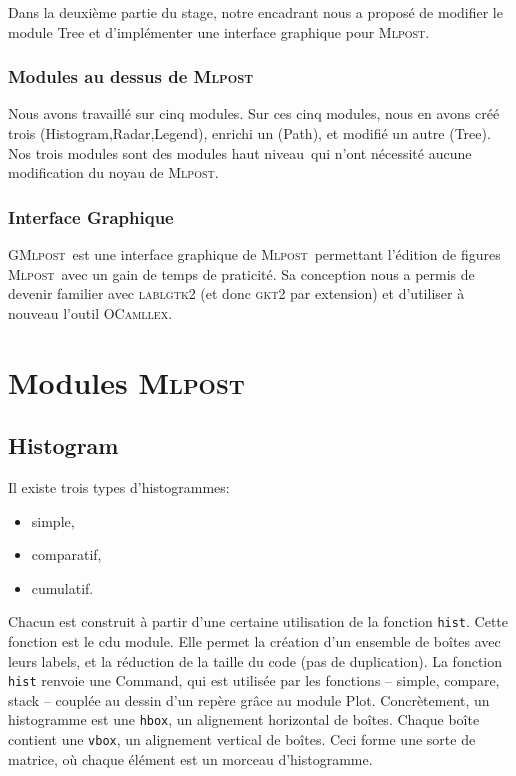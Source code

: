 \documentclass[a4paper,12pt]{article}
\newcommand{\mlpost}{\textsc{Mlpost}}
\newcommand{\gmlpost}{\textsc{GMlpost}}
\begin{document}
Dans la deuxième partie du stage, notre encadrant nous a proposé de modifier le module Tree et d'implémenter une interface graphique pour \mlpost.

\subsubsection{Modules au dessus de \mlpost}
Nous avons travaillé sur cinq modules. 
Sur ces cinq modules, nous en avons créé trois (Histogram,Radar,Legend), enrichi un (Path), et modifié un autre (Tree).
Nos trois modules sont des modules \og haut niveau\fg\ qui n'ont nécessité aucune modification du noyau de \mlpost. 
\subsubsection{Interface Graphique}
\gmlpost\ est une interface graphique de \mlpost\ permettant l'édition de figures \mlpost\ avec un gain de temps de praticité. Sa conception nous a permis de devenir familier avec \textsc{lablgtk2} (et donc \textsc{gkt2} par extension) et d'utiliser à nouveau l'outil \textsc{OCamllex}.

\section{Modules \mlpost}

\subsection{Histogram}
Il existe trois types d'histogrammes:
\begin{itemize}
\item simple,
\item comparatif,
\item cumulatif.
\end{itemize}
\bigskip 

Chacun est construit à partir d'une certaine utilisation de la fonction \texttt{hist}. Cette fonction est le c\oeur du module. Elle permet la création d'un ensemble de boîtes avec leurs labels, et la réduction de la taille du code (pas de duplication). La fonction \texttt{hist} renvoie une Command, qui est utilisée par les fonctions -- simple, compare, stack -- couplée au dessin d'un repère grâce au module Plot.
Concrètement, un histogramme est une \texttt{hbox}, un alignement horizontal de boîtes. Chaque boîte contient une \texttt{vbox}, un alignement vertical de boîtes. Ceci forme une sorte de matrice, où chaque élément est un morceau d'histogramme.
\end{document}
